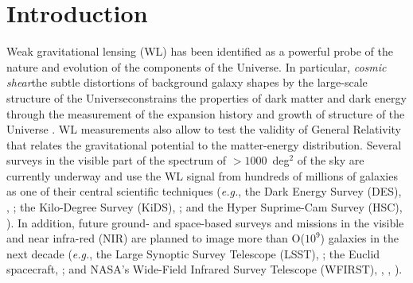 \documentclass[11pt,preprint,flushrt]{aastex}
\begin{document}
\section{Introduction}
Weak gravitational lensing (WL) has been identified as a powerful probe of the nature and evolution of the components of the Universe. In particular, \emph{cosmic shear}\textemdash the subtle  distortions of background galaxy shapes by the large-scale structure of the Universe\textemdash constrains the properties of dark matter and dark energy through the measurement of the expansion history and growth of structure of the Universe \citep{refregier03, hoekstra08, kilbinger15}. WL measurements also allow to test the validity of General Relativity that relates the gravitational potential to the matter-energy distribution. Several surveys in the visible part of the spectrum  of $>1000$~deg$^2$ of the sky are currently underway and use the WL signal from hundreds of millions of galaxies as one of their central scientific techniques (\emph{e.g.}, the Dark Energy Survey (DES), \citealt{diehl12}, \citealt{jarvis15}; the Kilo-Degree Survey (KiDS), \citealt{kuijken15}; and the Hyper Suprime-Cam Survey (HSC), \citealt{miyazaki12}). In addition, future ground- and space-based surveys and missions in the visible and near infra-red (NIR) are planned to image more than O($10^9$) galaxies in the next decade (\emph{e.g.}, the Large Synoptic Survey Telescope (LSST), \citealt{ivezic08}; the Euclid spacecraft, \citealt{laureijs11}; and NASA's Wide-Field Infrared Survey Telescope (WFIRST), \citealt{green12}, \citealt{spergel13}, \citealt{spergel15}).
\end{document}
